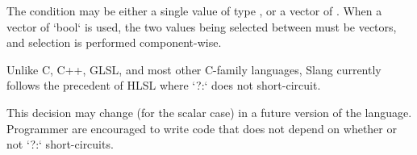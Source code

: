 The condition may be either a single value of type , or a vector of .
When a vector of `bool` is used, the two values being selected between must be vectors, and selection is performed component-wise.

\begin{Note}
Unlike C, C++, GLSL, and most other C-family languages, Slang currently follows the precedent of HLSL where `?:` does not short-circuit.

This decision may change (for the scalar case) in a future version of the language.
Programmer are encouraged to write code that does not depend on whether or not `?:` short-circuits.
\end{Note}